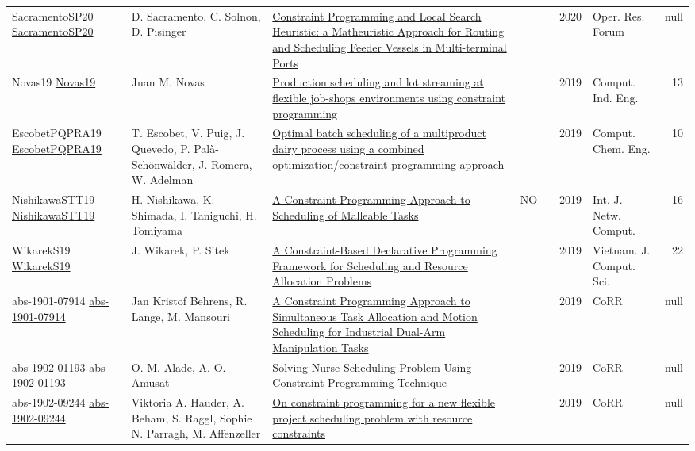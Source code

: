 {\begin{longtable}{p{3cm}p{6cm}p{7cm}rrrp{3cm}r}
SacramentoSP20 \href{https://doi.org/10.1007/s43069-020-00036-x}{SacramentoSP20} & D. Sacramento, C. Solnon, D. Pisinger & \href{articles/SacramentoSP20.pdf}{Constraint Programming and Local Search Heuristic: a Matheuristic Approach for Routing and Scheduling Feeder Vessels in Multi-terminal Ports} &  & \cite{SacramentoSP20} & 2020 & Oper. Res. Forum & null\\
Novas19 \href{https://doi.org/10.1016/j.cie.2019.07.011}{Novas19} & Juan M. Novas & \href{articles/Novas19.pdf}{Production scheduling and lot streaming at flexible job-shops environments using constraint programming} &  & \cite{Novas19} & 2019 & Comput. Ind. Eng. & 13\\
EscobetPQPRA19 \href{https://doi.org/10.1016/j.compchemeng.2018.08.040}{EscobetPQPRA19} & T. Escobet, V. Puig, J. Quevedo, P. Pal{\`{a}}{-}Sch{\"{o}}nw{\"{a}}lder, J. Romera, W. Adelman & \href{articles/EscobetPQPRA19.pdf}{Optimal batch scheduling of a multiproduct dairy process using a combined optimization/constraint programming approach} &  & \cite{EscobetPQPRA19} & 2019 & Comput. Chem. Eng. & 10\\
NishikawaSTT19 \href{http://www.ijnc.org/index.php/ijnc/article/view/201}{NishikawaSTT19} & H. Nishikawa, K. Shimada, I. Taniguchi, H. Tomiyama & \href{articles/NishikawaSTT19.pdf}{A Constraint Programming Approach to Scheduling of Malleable Tasks} & NO & \cite{NishikawaSTT19} & 2019 & Int. J. Netw. Comput. & 16\\
WikarekS19 \href{https://doi.org/10.1142/S2196888819500027}{WikarekS19} & J. Wikarek, P. Sitek & \href{articles/WikarekS19.pdf}{A Constraint-Based Declarative Programming Framework for Scheduling and Resource Allocation Problems} &  & \cite{WikarekS19} & 2019 & Vietnam. J. Comput. Sci. & 22\\
abs-1901-07914 \href{http://arxiv.org/abs/1901.07914}{abs-1901-07914} & Jan Kristof Behrens, R. Lange, M. Mansouri & \href{articles/abs-1901-07914.pdf}{A Constraint Programming Approach to Simultaneous Task Allocation and Motion Scheduling for Industrial Dual-Arm Manipulation Tasks} &  & \cite{abs-1901-07914} & 2019 & CoRR & null\\
abs-1902-01193 \href{http://arxiv.org/abs/1902.01193}{abs-1902-01193} & O. M. Alade, A. O. Amusat & \href{articles/abs-1902-01193.pdf}{Solving Nurse Scheduling Problem Using Constraint Programming Technique} &  & \cite{abs-1902-01193} & 2019 & CoRR & null\\
abs-1902-09244 \href{http://arxiv.org/abs/1902.09244}{abs-1902-09244} & Viktoria A. Hauder, A. Beham, S. Raggl, Sophie N. Parragh, M. Affenzeller & \href{articles/abs-1902-09244.pdf}{On constraint programming for a new flexible project scheduling problem with resource constraints} &  & \cite{abs-1902-09244} & 2019 & CoRR & null\\

\end{longtable}}
